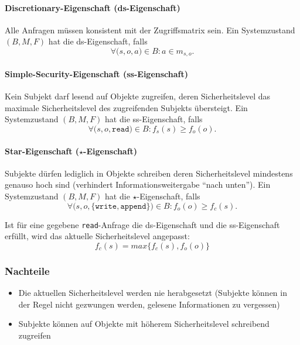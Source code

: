 \paragraph{Discretionary-Eigenschaft (ds-Eigenschaft)}
Alle Anfragen müssen konsistent mit der Zugriffsmatrix sein. Ein Systemzustand \((B,M,F)\) hat die ds-Eigenschaft, falls
\[\forall\big(s,o,a\big) \in B : a \in m_{s,o}.\]

\paragraph{Simple-Security-Eigenschaft (ss-Eigenschaft)}
Kein Subjekt darf lesend auf Objekte zugreifen, deren Sicherheitslevel das maximale Sicherheitslevel des zugreifenden Subjekts übersteigt. Ein Systemzustand \((B,M,F)\) hat die ss-Eigenschaft, falls
\[\forall\big(s,o,\texttt{read}\big) \in B : f_s(s) \geq f_o(o).\]

\paragraph{Star-Eigenschaft (\(\star\)-Eigenschaft)}
Subjekte dürfen lediglich in Objekte schreiben deren Sicherheitslevel mindestens genauso hoch sind (verhindert Informationsweitergabe "`nach unten"'). Ein Systemzustand \((B,M,F)\) hat die \(\star\)-Eigenschaft, falls
\[\forall\big(s,o,\{\texttt{write},\texttt{append}\}\big) \in B : f_o(o) \geq f_c(s).\]

Ist für eine gegebene \texttt{read}-Anfrage die ds-Eigenschaft und die ss-Eigenschaft erfüllt, wird das aktuelle Sicherheitslevel angepasst:
\[f_c(s) = max\big\{f_c(s),f_o(o)\big\}\]

\subsubsection{Nachteile}
\begin{itemize}
	\item Die aktuellen Sicherheitslevel werden nie herabgesetzt (Subjekte können in der Regel nicht gezwungen werden, gelesene Informationen zu vergessen)
	\item Subjekte können auf Objekte mit höherem Sicherheitslevel schreibend zugreifen
\end{itemize}



